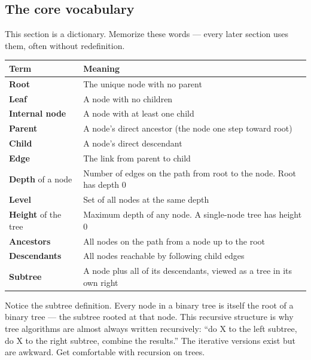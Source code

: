 \documentclass[11pt]{article}
\begin{document}
\subsection*{The core vocabulary}

This section is a dictionary. Memorize these words --- every later
section uses them, often without redefinition.

\begin{center}
\begin{tabular}{|l|p{9.5cm}|}
\hline
\textbf{Term} & \textbf{Meaning} \\
\hline
\textbf{Root}           & The unique node with no parent \\
\textbf{Leaf}           & A node with no children \\
\textbf{Internal node}  & A node with at least one child \\
\textbf{Parent}         & A node's direct ancestor (the node one step toward root) \\
\textbf{Child}          & A node's direct descendant \\
\textbf{Edge}           & The link from parent to child \\
\textbf{Depth} of a node & Number of edges on the path from root to the node. Root has depth 0 \\
\textbf{Level}          & Set of all nodes at the same depth \\
\textbf{Height} of the tree & Maximum depth of any node. A single-node tree has height 0 \\
\textbf{Ancestors}      & All nodes on the path from a node up to the root \\
\textbf{Descendants}    & All nodes reachable by following child edges \\
\textbf{Subtree}        & A node plus all of its descendants, viewed as a tree in its own right \\
\hline
\end{tabular}
\end{center}

\begin{ideabox}
Notice the subtree definition. Every node in a binary tree is
itself the root of a binary tree --- the subtree rooted at that
node. This recursive structure is why tree algorithms are almost
always written recursively: ``do X to the left subtree, do X to
the right subtree, combine the results.'' The iterative versions
exist but are awkward. Get comfortable with recursion on trees.
\end{ideabox}
\end{document}
